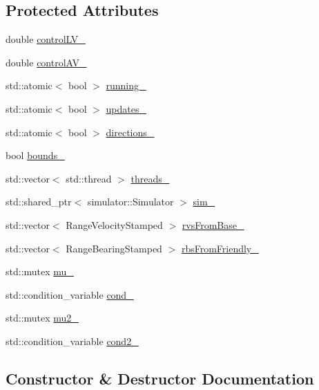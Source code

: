 \subsection*{Protected Attributes}
\begin{DoxyCompactItemize}
\item 
double \hyperlink{classPilotBase_a82d3b43b76c70d07cb5491974fe1f600}{control\+L\+V\+\_\+}
\item 
double \hyperlink{classPilotBase_aabd1864c036bdc142e5189b4d5b7c7f1}{control\+A\+V\+\_\+}
\item 
std\+::atomic$<$ bool $>$ \hyperlink{classPilotBase_aa6d7282efaf823724de187522476156e}{running\+\_\+}
\item 
std\+::atomic$<$ bool $>$ \hyperlink{classPilotBase_ab45516b59a0299c2fff103980d36fcbb}{updates\+\_\+}
\item 
std\+::atomic$<$ bool $>$ \hyperlink{classPilotBase_a9ff8d833d42683386ab80683134b305b}{directions\+\_\+}
\item 
bool \hyperlink{classPilotBase_ae8bb92255b3adf910c9d31f0d41c50e9}{bounds\+\_\+}
\item 
std\+::vector$<$ std\+::thread $>$ \hyperlink{classPilotBase_a477c1e12ccbb744f1099b8f201993a8d}{threads\+\_\+}
\item 
std\+::shared\+\_\+ptr$<$ simulator\+::\+Simulator $>$ \hyperlink{classPilotBase_a4a4bd780088562427f52987edb4ad483}{sim\+\_\+}
\item 
std\+::vector$<$ Range\+Velocity\+Stamped $>$ \hyperlink{classPilotBase_a3c299fe0fc0d088a0b8aa7e23e687a6e}{rvs\+From\+Base\+\_\+}
\item 
std\+::vector$<$ Range\+Bearing\+Stamped $>$ \hyperlink{classPilotBase_ae89933ad32a4633b89dad48ef07494b6}{rbs\+From\+Friendly\+\_\+}
\item 
std\+::mutex \hyperlink{classPilotBase_af41263e699653e27b79d11ae04dd5380}{mu\+\_\+}
\item 
std\+::condition\+\_\+variable \hyperlink{classPilotBase_ac784e1362d97a66206345dc87661401d}{cond\+\_\+}
\item 
std\+::mutex \hyperlink{classPilotBase_adadfe76dc44fb9181239010477a9d6ba}{mu2\+\_\+}
\item 
std\+::condition\+\_\+variable \hyperlink{classPilotBase_a10f7b5604e3993094d681f031f566f49}{cond2\+\_\+}
\end{DoxyCompactItemize}


\subsection{Constructor \& Destructor Documentation}
\mbox{\label{classPilotBase_ad7443e4d4655d319c2ae5a6251b294f5}} 
